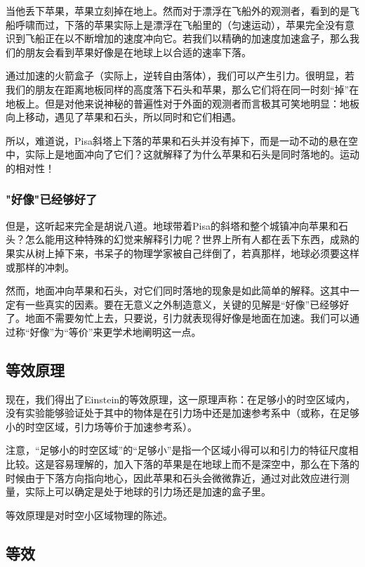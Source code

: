当他丢下苹果，苹果立刻掉在地上。然而对于漂浮在飞船外的观测者，看到的是飞船呼啸而过，下落的苹果实际上是漂浮在飞船里的（匀速运动），苹果完全没有意识到飞船正在以不断增加的速度冲向它。若我们以精确的加速度加速盒子，那么我们的朋友会看到苹果好像是在地球上以合适的速率下落。

通过加速的火箭盒子（实际上，逆转自由落体），我们可以产生引力。很明显，若我们的朋友在距离地板同样的高度落下石头和苹果，那么它们将在同一时刻“掉”在地板上。但是对他来说神秘的普遍性对于外面的观测者而言极其可笑地明显：地板向上移动，遇见了苹果和石头，所以同时和它们相遇。

所以，难道说，Pisa斜塔上下落的苹果和石头并没有掉下，而是一动不动的悬在空中，实际上是地面冲向了它们？这就解释了为什么苹果和石头是同时落地的。运动的相对性！

\subsubsection{"好像"已经够好了}
但是，这听起来完全是胡说八道。地球带着Pisa的斜塔和整个城镇冲向苹果和石头？怎么能用这种特殊的幻觉来解释引力呢？世界上所有人都在丢下东西，成熟的果实从树上掉下来，书呆子的物理学家被自己绊倒了，若真那样，地球必须要这样或那样的冲刺。

然而，地面冲向苹果和石头，对它们同时落地的现象是如此简单的解释。这其中一定有一些真实的因素。要在无意义之外制造意义，关键的见解是“好像”已经够好了。地面不需要匆忙上去，只要说，引力就表现得好像是地面在加速。我们可以通过称“好像”为“等价”来更学术地阐明这一点。


\subsection{等效原理}
现在，我们得出了Einstein的等效原理，这一原理声称：在足够小的时空区域内，没有实验能够验证处于其中的物体是在引力场中还是加速参考系中（或称，在足够小的时空区域，引力场等价于加速参考系）。

注意，“足够小的时空区域”的“足够小”是指一个区域小得可以和引力的特征尺度相比较。这是容易理解的，加入下落的苹果是在地球上而不是深空中，那么在下落的时候由于下落方向指向地心，因此苹果和石头会微微靠近，通过对此效应进行测量，实际上可以确定是处于地球的引力场还是加速的盒子里。

等效原理是对时空小区域物理的陈述。

\subsection{等效}



